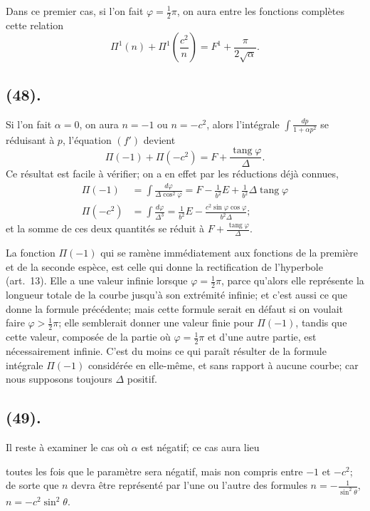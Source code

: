 \documentclass{article}
\begin{document}
Dans ce premier cas, si l'on fait $\varphi=\frac{1}{2}\pi$, on aura entre les fonctions complètes cette relation
\[ \Pi^{1}(n)+\Pi^{1}\left(\frac{c^{2}}{n}\right)=F^{1}+\frac{\pi}{2\sqrt{\alpha}}. \]

\subsection*{(48).}

Si l'on fait $\alpha=0$, on aura $n=-1$ ou $n=-c^{2}$, alors l'intégrale $\displaystyle\int\frac{dp}{1+\alpha p^{2}}$ se réduisant à $p$, l'équation $(f')$ devient
\[ \Pi(-1)+\Pi(-c^{2})=F+\frac{\operatorname{tang}\varphi}{\Delta}. \]
Ce résultat est facile à vérifier; on a en effet par les réductions déjà connues,
\[ \begin{aligned} \Pi(-1)&=\int\frac{d\varphi}{\Delta\cos^{2}\varphi}=F-\frac{1}{b^{2}}E+\frac{1}{b^{2}}\Delta\operatorname{tang}\varphi\\ \Pi(-c^{2})&=\int\frac{d\varphi}{\Delta^{3}}=\frac{1}{b^{2}}E-\frac{c^{2}\sin\varphi\cos\varphi}{b^{2}\Delta}; \end{aligned} \]
et la somme de ces deux quantités se réduit à $F+\frac{\operatorname{tang}\varphi}{\Delta}$.

La fonction $\Pi(-1)$ qui se ramène immédiatement aux fonctions de la première et de la seconde espèce, est celle qui donne la rectification de l'hyperbole (art.\ 13). Elle a une valeur infinie lorsque $\varphi=\frac{1}{2}\pi$, parce qu'alors elle représente la longueur totale de la courbe jusqu'à son extrémité infinie; et c'est aussi ce que donne la formule précédente; mais cette formule serait en défaut si on voulait faire $\varphi>\frac{1}{2}\pi$; elle semblerait donner une valeur finie pour $\Pi(-1)$, tandis que cette valeur, composée de la partie où $\varphi=\frac{1}{2}\pi$ et d'une autre partie, est nécessairement infinie. C'est du moins ce qui paraît résulter de la formule intégrale $\Pi(-1)$ considérée en elle-même, et sans rapport à aucune courbe; car nous supposons toujours $\Delta$ positif.

\subsection*{(49).}

Il reste à examiner le cas où $\alpha$ est négatif; ce cas aura lieu

toutes les fois que le paramètre sera négatif, mais non compris entre $-1$ et $-c^{2}$; de sorte que $n$ devra être représenté par l'une ou l'autre des formules $n=-\frac{1}{\sin^{2}\theta}$, $n=-c^{2}\sin^{2}\theta$.
\end{document}
